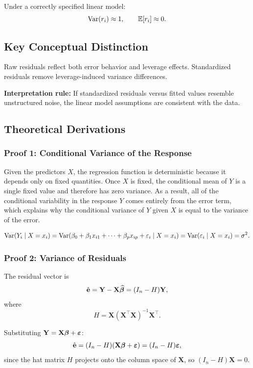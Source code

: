 Under a correctly specified linear model:
\[
\operatorname{Var}(r_i) \approx 1, \qquad \mathbb{E}[r_i] \approx 0.
\]

\subsection{Key Conceptual Distinction}

Raw residuals reflect both error behavior and leverage effects. Standardized residuals remove leverage-induced variance differences.

\textbf{Interpretation rule:} If standardized residuals versus fitted values resemble unstructured noise, the linear model assumptions are consistent with the data.

\subsection{Theoretical Derivations}

\subsubsection*{Proof 1: Conditional Variance of the Response}

Given the predictors $X$, the regression function is deterministic because it depends only on fixed quantities. Once $X$ is fixed, the conditional mean of $Y$ is a single fixed value and therefore has zero variance. As a result, all of the conditional variability in the response $Y$ comes entirely from the error term, which explains why the conditional variance of $Y$ given $X$ is equal to the variance of the error.

\[
\operatorname{Var}(Y_i \mid X=x_i)
= \operatorname{Var}(\beta_0 + \beta_1 x_{i1} + \cdots + \beta_p x_{ip} + \varepsilon_i \mid X=x_i)
= \operatorname{Var}(\varepsilon_i \mid X=x_i)
= \sigma^2.
\]

\subsubsection*{Proof 2: Variance of Residuals}

The residual vector is
\[
\hat{\mathbf{e}}
= \mathbf{Y} - \mathbf{X}\widehat{\boldsymbol{\beta}}
= (I_n - H)\mathbf{Y},
\]
where
\[
H = \mathbf{X}(\mathbf{X}^\top \mathbf{X})^{-1}\mathbf{X}^\top.
\]

Substituting $\mathbf{Y} = \mathbf{X}\boldsymbol{\beta} + \boldsymbol{\varepsilon}$:
\[
\hat{\mathbf{e}}
= (I_n - H)(\mathbf{X}\boldsymbol{\beta} + \boldsymbol{\varepsilon})
= (I_n - H)\boldsymbol{\varepsilon},
\]
since the hat matrix $H$ projects onto the column space of $\mathbf{X}$, so $(I_n - H)\mathbf{X} = 0$.

